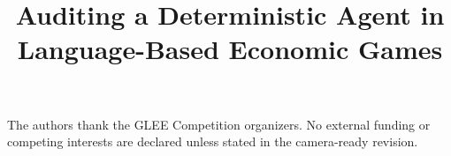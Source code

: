 \documentclass{article}
\title{Auditing a Deterministic Agent in Language-Based Economic Games}
\author{\PaperAuthors}
\begin{document}
\maketitle










\begin{ack}
The authors thank the GLEE Competition organizers. No external funding or
competing interests are declared unless stated in the camera-ready revision.
\end{ack}




\appendix




\newpage

\end{document}
